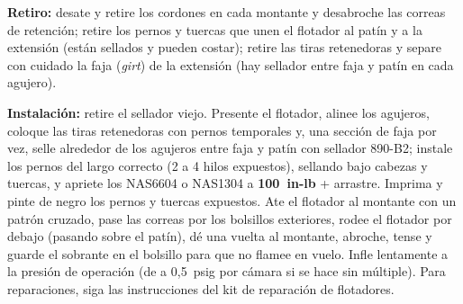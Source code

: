 \textbf{Retiro:} desate y retire los cordones en cada montante y desabroche las correas de retención; retire los pernos y tuercas que unen el flotador al patín y a la extensión (están sellados y pueden costar); retire las tiras retenedoras y separe con cuidado la faja (\emph{girt}) de la extensión (hay sellador entre faja y patín en cada agujero).

\textbf{Instalación:} retire el sellador viejo. Presente el flotador, alinee los agujeros, coloque las tiras retenedoras con pernos temporales y, una sección de faja por vez, selle alrededor de los agujeros entre faja y patín con sellador 890-B2; instale los pernos del largo correcto (2 a 4 hilos expuestos), sellando bajo cabezas y tuercas, y apriete los NAS6604 o NAS1304 a \textbf{100~in-lb} + arrastre. Imprima y pinte de negro los pernos y tuercas expuestos. Ate el flotador al montante con un patrón cruzado, pase las correas por los bolsillos exteriores, rodee el flotador por debajo (pasando sobre el patín), dé una vuelta al montante, abroche, tense y guarde el sobrante en el bolsillo para que no flamee en vuelo. Infle lentamente a la presión de operación (de a 0,5~psig por cámara si se hace sin múltiple). Para reparaciones, siga las instrucciones del kit de reparación de flotadores.
